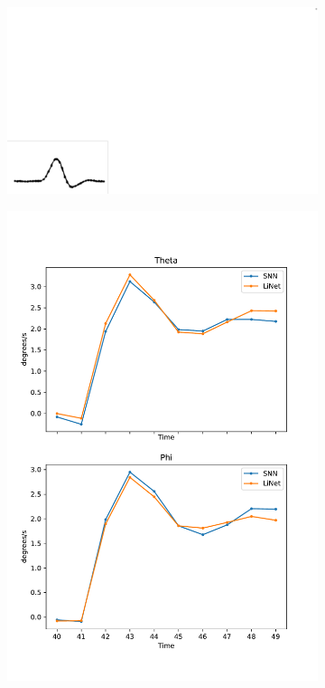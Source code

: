 \documentclass [MS] {UCLAthesis}
\begin{document}
\begin{figure}
    \centering

    \begin{subfigure}[b]{0.2\textwidth}
        \centering
        \includegraphics[width=\textwidth]{saccade_human_vel}
        \caption{}
        \label{fig:saccade_human_vel}
    \end{subfigure}
    \hfill
    \begin{subfigure}[b]{0.2\textwidth}
        \centering
        \includegraphics[width=\textwidth]{saccade_human_vel_normal}

\end{subfigure}
\end{figure}
\end{document}
